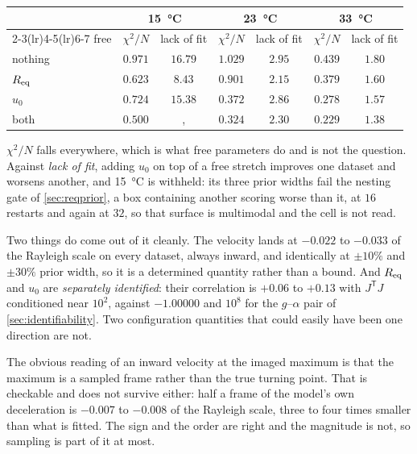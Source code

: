 \documentclass[10pt]{article}
\begin{document}
\begin{center}
\begin{tabular}{lcccccc}
\toprule
& \multicolumn{2}{c}{\SI{15}{\celsius}} & \multicolumn{2}{c}{\SI{23}{\celsius}}
& \multicolumn{2}{c}{\SI{33}{\celsius}} \\
\cmidrule(lr){2-3}\cmidrule(lr){4-5}\cmidrule(lr){6-7}
free & $\chi^2/N$ & lack of fit & $\chi^2/N$ & lack of fit & $\chi^2/N$ & lack of fit \\
\midrule
nothing & $0.971$ & $16.79$ & $1.029$ & $2.95$ & $0.439$ & $1.80$ \\
$R_{\rm eq}$ & $0.623$ & $\mathbf{8.43}$ & $0.901$ & $\mathbf{2.15}$ & $0.379$ & $1.60$ \\
$u_0$ & $0.724$ & $15.38$ & $0.372$ & $2.86$ & $0.278$ & $1.57$ \\
both & $0.500$ &, & $0.324$ & $2.30$ & $0.229$ & $\mathbf{1.38}$ \\
\bottomrule
\end{tabular}
\end{center}

\noindent $\chi^2/N$ falls everywhere, which is what free parameters do and is not the
question. Against \emph{lack of fit}, adding $u_0$ on top of a free stretch improves one dataset
and worsens another, and \SI{15}{\celsius} is withheld: its three prior widths fail the nesting
gate of \cref{sec:reqprior}, a box containing another scoring worse than it, at $16$
restarts and again at $32$, so that surface is multimodal and the cell is not read.

Two things do come out of it cleanly. The velocity lands at $-0.022$ to $-0.033$ of the Rayleigh
scale on every dataset, always inward, and identically at $\pm10\%$ and $\pm30\%$ prior width, so
it is a determined quantity rather than a bound. And $R_{\rm eq}$ and $u_0$ are \emph{separately
identified}: their correlation is $+0.06$ to $+0.13$ with $J^{\mathsf T}J$ conditioned near
$10^2$, against $-1.00000$ and $10^8$ for the $g$--$\alpha$ pair of \cref{sec:identifiability}.
Two configuration quantities that could easily have been one direction are not.

The obvious reading of an inward velocity at the imaged maximum is that the maximum is a sampled
frame rather than the true turning point. That is checkable and does not survive either: half a
frame of the model's own deceleration is $-0.007$ to $-0.008$ of the Rayleigh scale, three to
four times smaller than what is fitted. The sign and the order are right and the magnitude is
not, so sampling is part of it at most.
\end{document}
